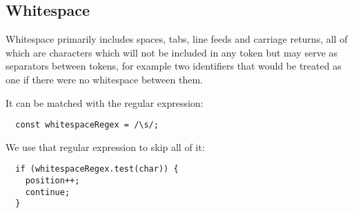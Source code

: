 \subsection{Whitespace}
Whitespace primarily includes spaces, tabs, line feeds and carriage returns,
all of which are characters which will not be included in any token
but may serve as separators between tokens,
for example two identifiers that would be treated as one
if there were no whitespace between them.

It can be matched with the regular expression:
\begin{verbatim}
  const whitespaceRegex = /\s/;
\end{verbatim}

We use that regular expression to skip all of it:
\begin{verbatim}
  if (whitespaceRegex.test(char)) {
    position++;
    continue;
  }
\end{verbatim}

